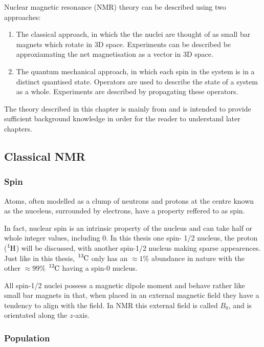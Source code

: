 Nuclear magnetic resonance (NMR) theory can be described using two approaches:
\begin{enumerate}
  \item The classical approach, in which the the nuclei are thought of as small bar magnets which
  rotate in 3D space. Experiments can be described be approxiamating the net magnetisation as a
  vector in 3D space.
  \item The quantum mechanical approach, in which each spin in the system is in a distinct quantised state.
  Operators are used to describe the state of a system as a whole. Experiments are described by propagating
  these operators.
\end{enumerate}

The theory described in this chapter is mainly from \citep{RN135,RN136} and is intended to provide sufficient background
knowledge in order for the reader to understand later chapters.

\subsection{Classical NMR}

\subsubsection{Spin}

Atoms, often modelled as a clump of neutrons and protons at
the centre known as the nuceleus, surrounded by electrons, have a property reffered to as spin.

In fact, nuclear spin is an intrinsic property of the nucleus and can take half or whole
integer values, including $0$. In this thesis one spin- 1/2 nucleus, the proton ($\ce{^{1}H}$) will be discussed, with another spin-1/2 nucleus  making
sparse appearences. Just like in this thesis, $\ce{^{13}C}$ only has an $\approx{1}\%$
abundance in nature with the other $\approx{99}\%$ $\ce{^{12}C}$ having a spin-$0$
nucleus.

All spin-1/2 nuclei possess a magnetic dipole moment and behave rather like small bar magnets in that, when placed in an external magnetic field they have a tendency to align
with the field. In NMR this external field is called $B_0$, and is orientated along the
$z$-axis.

\subsubsection{Population}\label{Population}

